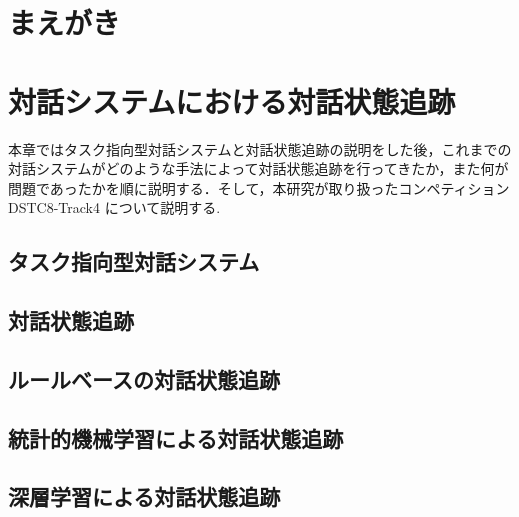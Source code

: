 \documentclass[12pt,frame,epsbox]{other/jmyreport}
\begin{document}

\normalsize
{}
\pagestyle{myheadings}
\setcounter{page}{0}
\tableofcontents                         %
\setlength{\baselineskip}{14.5pt}
\listoffigures                           %
\listoftables                            %

\setlength{\baselineskip}{20pt}
\chapter{まえがき}                      %

\chapter{対話システムにおける対話状態追跡}
本章ではタスク指向型対話システムと対話状態追跡の説明をした後，これまでの対話システムがどのような手法によって対話状態追跡を行ってきたか，また何が問題であったかを順に説明する．そして，本研究が取り扱ったコンペティション DSTC8-Track4 について説明する.
\section{タスク指向型対話システム}

\section{対話状態追跡}


\section{ルールベースの対話状態追跡}

\section{統計的機械学習による対話状態追跡}

\section{深層学習による対話状態追跡}

\end{document}
